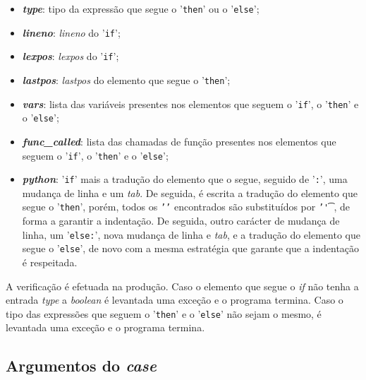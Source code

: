 \documentclass[11pt,a4paper]{report}
\begin{document}
\begin{itemize}
    \item \textit{\textbf{type}}: tipo da expressão que segue o '\texttt{then}' ou o '\texttt{else}';
    \item \textit{\textbf{lineno}}: \textit{lineno} do '\texttt{if}';
    \item \textit{\textbf{lexpos}}: \textit{lexpos} do '\texttt{if}';
    \item \textit{\textbf{lastpos}}: \textit{lastpos} do elemento que segue o '\texttt{then}';
    \item \textit{\textbf{vars}}: lista das variáveis presentes nos elementos que seguem o '\texttt{if}', o '\texttt{then}' e o '\texttt{else}';
    \item \textit{\textbf{func\_called}}: lista das chamadas de função presentes nos elementos que seguem o '\texttt{if}', o '\texttt{then}' e o '\texttt{else}';
    \item \textit{\textbf{python}}: '\texttt{if}' mais a tradução do elemento que o segue, seguido de '\texttt{:}', uma mudança de linha e um \textit{tab}. De seguida, é escrita a tradução do elemento que segue o '\texttt{then}', porém, todos os \texttt{'\n'} encontrados são substituídos por \texttt{'\n\t'}, de forma a garantir a indentação. De seguida, outro carácter de mudança de linha, um '\texttt{else:}', nova mudança de linha e \textit{tab}, e a tradução do elemento que segue o '\texttt{else}', de novo com a mesma estratégia que garante que a indentação é respeitada.
\end{itemize}

A verificação é efetuada na produção. Caso o elemento que segue o \textit{if} não tenha a entrada \textit{type} a \textit{boolean} é levantada uma exceção e o programa termina. Caso o tipo das expressões que seguem o '\texttt{then}' e o '\texttt{else}' não sejam o mesmo, é levantada uma exceção e o programa termina.

\subsection{Argumentos do \textit{case}}
\end{document}
